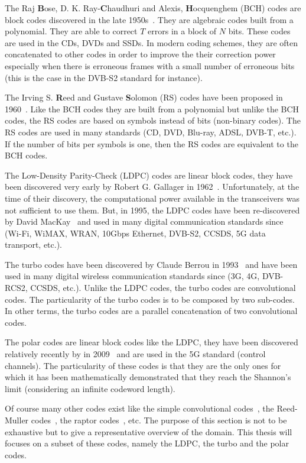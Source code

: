 The Raj \textbf{B}ose, D. K. Ray-\textbf{C}haudhuri and Alexis,
\textbf{H}ocquenghem (BCH) codes are block codes discovered in the late
1950s~\cite{Hocquenghem1959,Bose1960}. They are algebraic codes built from a
polynomial. They are able to correct $T$ errors in a block of $N$ bits. These
codes are used in the CDs, DVDs and SSDs. In modern coding schemes, they are
often concatenated to other codes in order to improve the their correction power
especially when there is erroneous frames with a small number of erroneous bits
(this is the case in the DVB-S2 standard for instance).

The Irving S. \textbf{R}eed and Gustave \textbf{S}olomon (RS) codes have been
proposed in 1960~\cite{Reed1960}. Like the BCH codes they are built from a
polynomial but unlike the BCH codes, the RS codes are based on symbols instead
of bits (non-binary codes). The RS codes are used in many standards (CD, DVD,
Blu-ray, ADSL, DVB-T, etc.). If the number of bits per symbols is one, then the
RS codes are equivalent to the BCH codes.

The Low-Density Parity-Check (LDPC) codes are linear block codes, they have been
discovered very early by Robert G. Gallager in 1962~\cite{Gallager1962}.
Unfortunately, at the time of their discovery, the computational power available
in the transceivers was not sufficient to use them. But, in 1995, the LDPC codes
have been re-discovered by David MacKay~\cite{MacKay1995} and used in many
digital communication standards since (Wi-Fi, WiMAX, WRAN, 10Gbps Ethernet,
DVB-S2, CCSDS, 5G data transport, etc.).

The turbo codes have been discovered by Claude Berrou in 1993~\cite{Berrou1993}
and have been used in many digital wireless communication standards since (3G,
4G, DVB-RCS2, CCSDS, etc.). Unlike the LDPC codes, the turbo codes are
convolutional codes. The particularity of the turbo codes is to be composed by
two sub-codes. In other terms, the turbo codes are a parallel concatenation of
two convolutional codes.

The polar codes are linear block codes like the LDPC, they have been discovered
relatively recently by \Arikan in 2009~\cite{Arikan2009} and are used in the
5G standard (control channels). The particularity of these codes is that they
are the only ones for which it has been mathematically demonstrated that they
reach the Shannon's limit (considering an infinite codeword length).

Of course many other codes exist like the simple convolutional
codes~\cite{Elias1955}, the Reed-Muller codes~\cite{Muller1954,Reed1954}, the
raptor codes~\cite{Shokrollahi2004}, etc. The purpose of this section is not to
be exhaustive but to give a representative overview of the domain. This thesis
will focuses on a subset of these codes, namely the LDPC, the turbo and the
polar codes.

